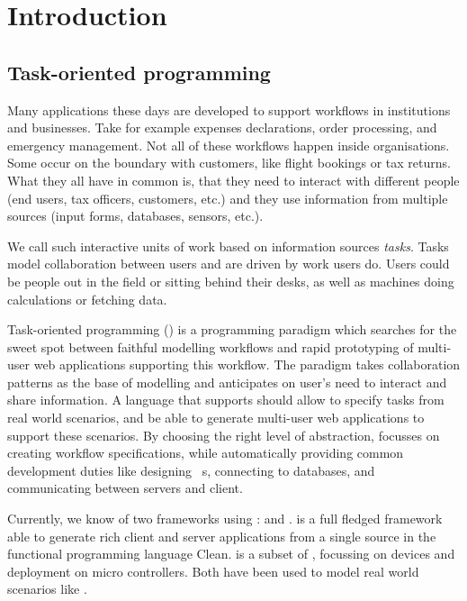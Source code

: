 


\section{Introduction}



\subsection{Task-oriented programming}

Many applications these days are developed to support workflows in institutions and businesses.
Take for example expenses declarations, order processing, and emergency management.
Not all of these workflows happen inside organisations.
Some occur on the boundary with customers, like flight bookings or tax returns.
What they all have in common is,
that they need to interact with different people (end users, tax officers, customers, etc.)
and they use information from multiple sources (input forms, databases, sensors, etc.).

We call such interactive units of work based on information sources \emph{tasks}.
Tasks model collaboration between users and are driven by work users do.
Users could be people out in the field or sitting behind their desks,
as well as machines doing calculations or fetching data.

Task-oriented programming (\TOP) is a programming paradigm which searches for the sweet spot between faithful modelling workflows
and rapid prototyping of multi-user web applications supporting this workflow.
The paradigm takes collaboration patterns as the base of modelling
and anticipates on user's need to interact and share information.
A language that supports \TOP should allow to specify tasks from real world scenarios,
and be able to generate multi-user web applications to support these scenarios.
By choosing the right level of abstraction,
\TOP focusses on creating workflow specifications,
while automatically providing common development duties like designing \GUI\ s, connecting to databases, and communicating between servers and client.

Currently, we know of two frameworks using \TOP: \ITASKS and \MTASKS.
\ITASKS is a full fledged \TOP framework able to generate rich client and server applications from a single source in the functional programming language Clean.
\MTASKS is a subset of \ITASKS,
focussing on \IOT devices and deployment on micro controllers.
Both have been used to model real world scenarios like .

